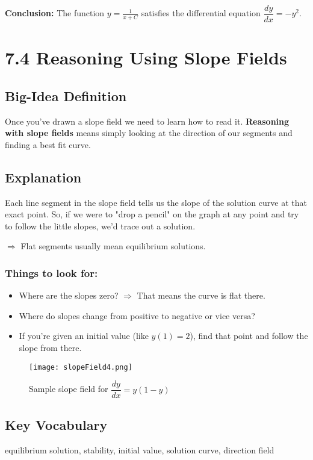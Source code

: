 \documentclass{article}
\begin{document}
\textbf{Conclusion:}  
The function \( y = \frac{1}{x + C} \) satisfies the differential equation \( \dfrac{dy}{dx} = -y^2 \). 


\newpage
\section{7.4 Reasoning Using Slope Fields}

\subsection{Big-Idea Definition}
Once you've drawn a slope field we need to learn how to read it. \textbf{Reasoning with slope fields} means simply looking at the direction of our segments and finding a best fit curve.

\subsection*{Explanation}
Each line segment in the slope field tells us the slope of the solution curve at that exact point. So, if we were to "drop a pencil" on the graph at any point and try to follow the little slopes, we'd trace out a solution.


\textbf{\(\Rightarrow\)} Flat segments usually mean equilibrium solutions.

\subsubsection*{Things to look for:}
\begin{itemize}
  \item Where are the slopes zero? \(\Rightarrow\) That means the curve is flat there.
  \item Where do slopes change from positive to negative or vice versa?
  \item If you’re given an initial value (like \(y(1) = 2\)), find that point and follow the slope from there.
\end{itemize}

\vspace{10pt}
\begin{figure}[h]
\caption{Sample slope field for \(\dfrac{dy}{dx} = y(1 - y)\)}
\texttt{[image: slopeField4.png]}
\end{figure}

\subsection*{Key Vocabulary}
equilibrium solution, stability, initial value, solution curve, direction field
\end{document}
